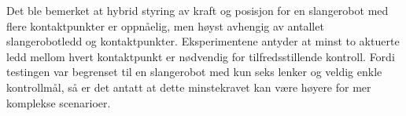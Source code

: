 Det ble bemerket at hybrid styring av kraft og posisjon for en slangerobot med flere kontaktpunkter er oppnåelig, men høyst avhengig av antallet slangerobotledd og kontaktpunkter. Eksperimentene antyder at minst to aktuerte ledd mellom hvert kontaktpunkt er nødvendig for tilfredsstillende kontroll. Fordi testingen var begrenset til en slangerobot med kun seks lenker og veldig enkle kontrollmål, så er det antatt at dette minstekravet kan være høyere for mer komplekse scenarioer.



\makeatletter
{}


\makeatother







